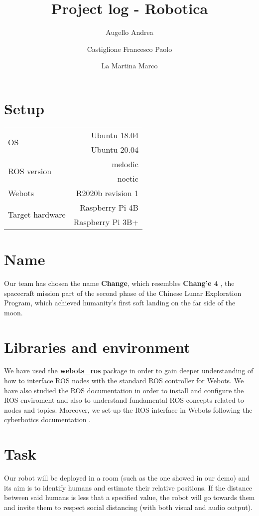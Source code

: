 \documentclass[a4paper]{article}
\begin{document}
	\title{Project log - Robotica}
	\author{Augello Andrea \and Castiglione Francesco Paolo \and La Martina Marco}
	\maketitle
	\tableofcontents

	\section{Setup}\label{sec:Setup}
	\begin{tabular}{|l|r|}
		\hline
		\multirow{2}{4em}{OS} & Ubuntu 18.04 \\
							  & Ubuntu 20.04 \\ \hline
		\multirow{2}{6em}{ROS version} & melodic \\
									   & noetic \\ \hline
		Webots & R2020b revision 1\\ \hline
		\multirow{2}{11em}{Target hardware} & Raspberry Pi 4B \\
											& Raspberry Pi 3B+ \\ \hline
	\end{tabular}

	\section{Name}\label{sec:Name}
	Our team has chosen the name \textbf{Change}, which resembles \textbf{Chang'e 4} \cite{change4}, the spacecraft mission part of the second phase of the Chinese Lunar Exploration Program, which achieved humanity's first soft landing on the far side of the moon.

	\section{Libraries and environment}\label{sec:Libraries}
	We have used the \textbf{webots\_ros} \cite{webotsRos} package in order to gain deeper understanding of how to interface ROS nodes with the standard ROS controller for Webots. We have also studied the ROS documentation \cite{rosTutorial} in order to install and configure the ROS enviroment and also to understand fundamental ROS concepts related to nodes and topics.
	Moreover, we set-up the ROS interface in Webots following the cyberbotics documentation \cite{rosTutorial}.
	
	\section{Task}
	Our robot will be deployed in a room (such as the one showed in our demo) and its aim is to identify humans and estimate their relative positions. If the distance between said humans is less that a specified value, the robot will go towards them and invite them to respect social distancing (with both visual and audio output).
	
\end{document}
